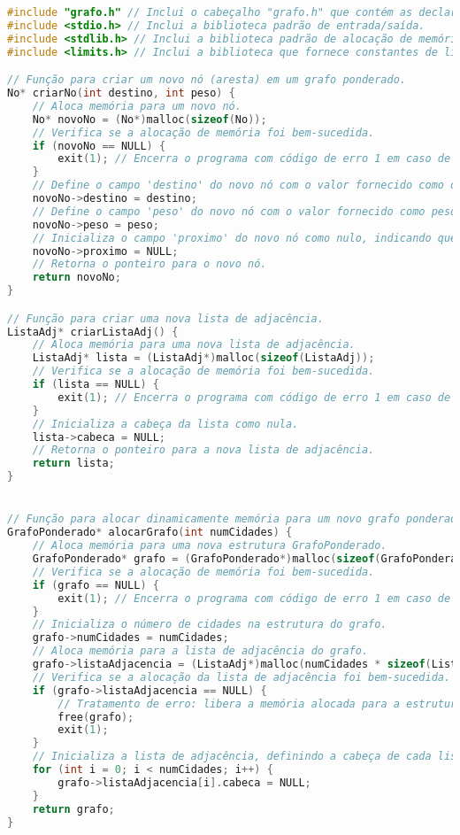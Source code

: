 \documentclass{article}
\begin{document}
\begin{lstlisting}[caption={grafo.c},label={lst:cod1},language=C]
#include "grafo.h" // Inclui o cabeçalho "grafo.h" que contém as declarações de funções e estruturas.
#include <stdio.h> // Inclui a biblioteca padrão de entrada/saída.
#include <stdlib.h> // Inclui a biblioteca padrão de alocação de memória.
#include <limits.h> // Inclui a biblioteca que fornece constantes de limites, incluindo INT_MAX.

// Função para criar um novo nó (aresta) em um grafo ponderado.
No* criarNo(int destino, int peso) {
    // Aloca memória para um novo nó.
    No* novoNo = (No*)malloc(sizeof(No));
    // Verifica se a alocação de memória foi bem-sucedida.
    if (novoNo == NULL) {
        exit(1); // Encerra o programa com código de erro 1 em caso de falha na alocação.
    }
    // Define o campo 'destino' do novo nó com o valor fornecido como destino.
    novoNo->destino = destino;
    // Define o campo 'peso' do novo nó com o valor fornecido como peso.
    novoNo->peso = peso;
    // Inicializa o campo 'proximo' do novo nó como nulo, indicando que inicialmente não há próximo nó na lista.
    novoNo->proximo = NULL;
    // Retorna o ponteiro para o novo nó.
    return novoNo;
}

// Função para criar uma nova lista de adjacência.
ListaAdj* criarListaAdj() {
    // Aloca memória para uma nova lista de adjacência.
    ListaAdj* lista = (ListaAdj*)malloc(sizeof(ListaAdj));
    // Verifica se a alocação de memória foi bem-sucedida.
    if (lista == NULL) {
        exit(1); // Encerra o programa com código de erro 1 em caso de falha na alocação.
    }
    // Inicializa a cabeça da lista como nula.
    lista->cabeca = NULL;
    // Retorna o ponteiro para a nova lista de adjacência.
    return lista;
}


// Função para alocar dinamicamente memória para um novo grafo ponderado.
GrafoPonderado* alocarGrafo(int numCidades) {
    // Aloca memória para uma nova estrutura GrafoPonderado.
    GrafoPonderado* grafo = (GrafoPonderado*)malloc(sizeof(GrafoPonderado));
    // Verifica se a alocação de memória foi bem-sucedida.
    if (grafo == NULL) {
        exit(1); // Encerra o programa com código de erro 1 em caso de falha na alocação.
    }
    // Inicializa o número de cidades na estrutura do grafo.
    grafo->numCidades = numCidades;
    // Aloca memória para a lista de adjacência do grafo.
    grafo->listaAdjacencia = (ListaAdj*)malloc(numCidades * sizeof(ListaAdj));
    // Verifica se a alocação da lista de adjacência foi bem-sucedida.
    if (grafo->listaAdjacencia == NULL) {
        // Tratamento de erro: libera a memória alocada para a estrutura do grafo e encerra o programa com código de erro 1.
        free(grafo);
        exit(1);
    }
    // Inicializa a lista de adjacência, definindo a cabeça de cada lista como nula.
    for (int i = 0; i < numCidades; i++) {
        grafo->listaAdjacencia[i].cabeca = NULL;
    }
    return grafo;
}


\end{lstlisting}
\end{document}
